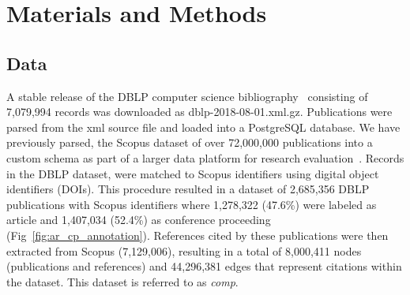 \section{Materials and Methods}
\label{sec:methods}

\subsection{Data}
 A stable release of the DBLP computer science bibliography~\cite{dblp_ref} consisting of 7,079,994 records was downloaded as dblp-2018-08-01.xml.gz. Publications were parsed from the xml source file and loaded into a PostgreSQL database. We have previously parsed, the Scopus dataset of over 72,000,000 publications into a custom schema as part of a larger data platform for research evaluation~\cite{GithubERNIE2019}. Records in the DBLP dataset, were matched to Scopus identifiers using digital object identifiers (DOIs). This procedure resulted in a dataset of 2,685,356 DBLP publications with Scopus identifiers where 1,278,322 (47.6\%) were labeled as article and 1,407,034 (52.4\%) as conference proceeding (Fig~\ref{fig:ar_cp_annotation}). References cited by these publications were then extracted from Scopus (7,129,006), resulting in a total of 8,000,411 nodes (publications and references) and  44,296,381 edges that represent citations within the dataset. This dataset is referred to as \emph{comp}.\par
 
